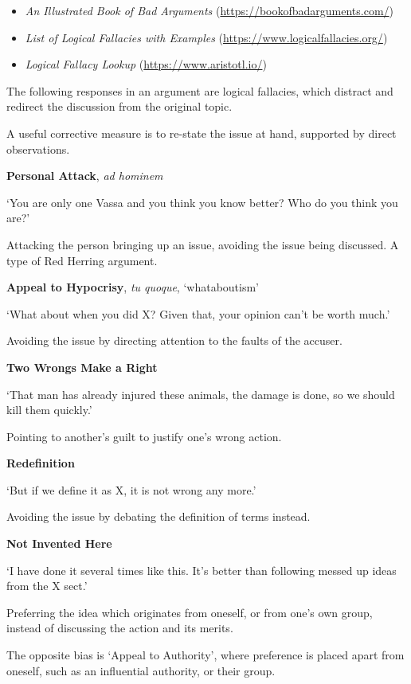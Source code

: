 \begin{itemize}
\tightlist
\item
  \emph{An Illustrated Book of Bad Arguments}
  (\url{https://bookofbadarguments.com/})
\item
  \emph{List of Logical Fallacies with Examples}
  (\url{https://www.logicalfallacies.org/})
\item
  \emph{Logical Fallacy Lookup} (\url{https://www.aristotl.io/})
\end{itemize}

\bigskip

The following responses in an argument are logical fallacies, which
distract and redirect the discussion from the original topic.

A useful corrective measure is to re-state the issue at hand, supported
by direct observations.

\textbf{Personal Attack}, \emph{ad hominem}

`You are only one Vassa and you think you know better? Who do you think
you are?'

Attacking the person bringing up an issue, avoiding the issue being
discussed. A type of Red Herring argument.

\textbf{Appeal to Hypocrisy}, \emph{tu quoque}, `whataboutism'

`What about when you did X? Given that, your opinion can't be worth
much.'

Avoiding the issue by directing attention to the faults of the accuser.

\textbf{Two Wrongs Make a Right}

`That man has already injured these animals, the damage is done, so we
should kill them quickly.'

Pointing to another's guilt to justify one's wrong action.

\textbf{Redefinition}

`But if we define it as X, it is not wrong any more.'

Avoiding the issue by debating the definition of terms instead.

\textbf{Not Invented Here}

`I have done it several times like this. It's better than following
messed up ideas from the X sect.'

Preferring the idea which originates from oneself, or from one's own
group, instead of discussing the action and its merits.

The opposite bias is `Appeal to Authority', where preference is placed
apart from oneself, such as an influential authority, or their group.

